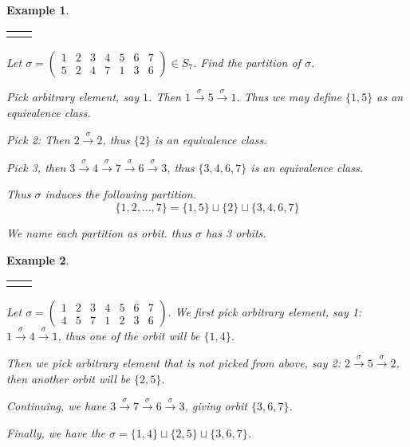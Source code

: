\documentclass{article}
\theoremstyle{MyNonumberplain}
\theoremstyle{break}
\newcommand{\nline}{\begin{tabular}{ll}&\\\end{tabular}}
\theoremstyle{break}
\newtheorem{example}{Example}[section]
\theoremstyle{break}
\theoremstyle{definition}
\theoremstyle{break}
\begin{document}
\begin{expbox}
    \begin{example}

        \nline

        Let $\sigma = \left(\begin{array}{ccccccc}
        1 & 2 & 3 & 4 & 5 & 6 & 7\\
        5 & 2 & 4 & 7 & 1 & 3 & 6
        \end{array}\right) \in S_7$. Find the partition of $\sigma$.\bigskip

        \begin{ansbox}
            Pick arbitrary element, say $1$. Then $1 \xrightarrow{\sigma} 5
            \xrightarrow{\sigma} 1$. Thus we may define $\{ 1, 5 \}$ as an equivalence
            class.\bigskip
            
            Pick 2: Then $2 \xrightarrow{\sigma} 2$, thus $\{ 2 \}$ is an equivalence
            class.\bigskip
            
            Pick 3, then $3 \xrightarrow{\sigma} 4 \xrightarrow{\sigma} 7
            \xrightarrow{\sigma} 6 \xrightarrow{\sigma} 3$, thus $\{ 3, 4, 6, 7 \}$ is an
            equivalence class.\bigskip
            
            Thus $\sigma$ induces the following partition.
            \[ \{ 1, 2, \ldots, 7 \} = \{ 1, 5 \} \sqcup \{ 2 \} \sqcup \{ 3, 4, 6, 7 \}
            \]
    
        \end{ansbox}

        We name each partition as orbit. thus $\sigma$ has 3 orbits.
    \end{example}   
\end{expbox}

\begin{expbox}
    \begin{example}

        \nline

        Let $\sigma = \left(\begin{array}{ccccccc}
            1 & 2 & 3 & 4 & 5 & 6 & 7\\
            4 & 5 & 7 & 1 & 2 & 3 & 6
          \end{array}\right) .$ We first pick arbitrary element, say 1: $1 \xrightarrow{\sigma} 4
          \xrightarrow{\sigma} 1$, thus one of the orbit will be $\{ 1, 4 \}$.\bigskip
          
          Then we pick arbitrary element that is not picked from above, say 2: $2
          \xrightarrow{\sigma} 5 \xrightarrow{\sigma} 2$, then another orbit will be
          $\{2, 5\}$.\bigskip
          
          Continuing, we have $3 \xrightarrow{\sigma} 7 \xrightarrow{\sigma} 6
          \xrightarrow{\sigma} 3$, giving orbit $\{ 3, 6, 7 \}$.\bigskip
          
          Finally, we have the $\sigma = \{ 1, 4 \} \sqcup \{ 2, 5 \} \sqcup \{ 3, 6, 7
          \}$.
    \end{example}
\end{expbox}
\end{document}

